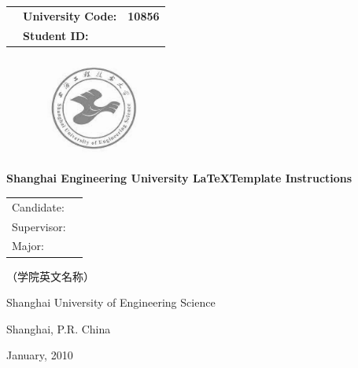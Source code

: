 \newpage
\begin{center}
    \begin{table}[hbpt]
        \centering
        \sihao\bfseries
        \begin{tabular}{p{}<{\raggedright}p{}<{\raggedleft}p{}<{\raggedright}}
            \textbf{} & \textbf{University Code:} & \textbf{10856}\\
            \textbf{}       & \textbf{Student ID:}  &  
        \end{tabular}
    \end{table}
    
    \begin{figure}[hbpt]
        \centering
        \includegraphics[height=3.31cm,width=3.55cm]{logo.png}
    \end{figure}

    \begin{center}
        \heiti\erhao\bfseries{Shanghai Engineering University \LaTeX Template Instructions}

        \heiti{}
    \end{center}

    \vspace{1cm}
    \begin{center}
        \begin{table}[hbpt]
            \centering
            \linespread{1.2}
            \songti\sanhao\bfseries
            \begin{tabular}{p{3cm}<{\centering}p{4.83cm}<{\centering}}
                Candidate: &\\       
                Supervisor:&\\
                Major:&\\
            \end{tabular}
        \end{table}

        \vspace{2cm}
        \begin{center}
            \sanhao\bfseries

            （学院英文名称）

            Shanghai University of Engineering Science

            Shanghai, P.R. China

            January, 2010
        \end{center}
    \end{center}
\end{center}
\newpage


